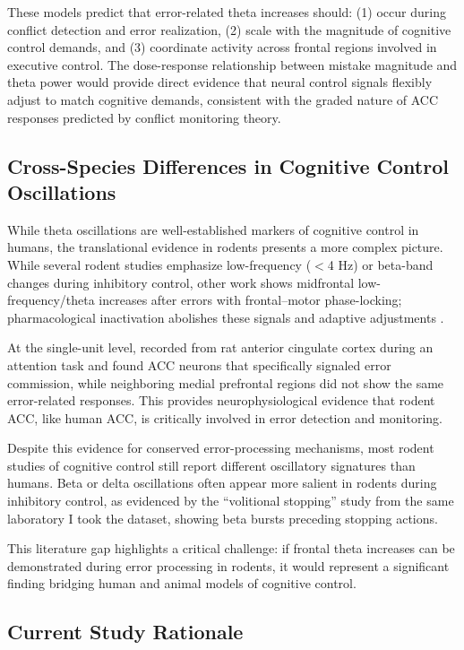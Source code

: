 \documentclass[11pt]{article}
\begin{document}
These models predict that error-related theta increases should: (1) occur during conflict detection and error realization, (2) scale with the magnitude of cognitive control demands, and (3) coordinate activity across frontal regions involved in executive control. The dose-response relationship between mistake magnitude and theta power would provide direct evidence that neural control signals flexibly adjust to match cognitive demands, consistent with the graded nature of ACC responses predicted by conflict monitoring theory.

\subsection{Cross-Species Differences in Cognitive Control Oscillations}

While theta oscillations are well-established markers of cognitive control in humans, the translational evidence in rodents presents a more complex picture. While several rodent studies emphasize low-frequency ($<$4 Hz) or beta-band changes during inhibitory control, other work shows midfrontal low-frequency/theta increases after errors with frontal–motor phase-locking; pharmacological inactivation abolishes these signals and adaptive adjustments \citep{narayanan2013common}.

At the single-unit level, \citet{totah2009anterior} recorded from rat anterior cingulate cortex during an attention task and found ACC neurons that specifically signaled error commission, while neighboring medial prefrontal regions did not show the same error-related responses. This provides neurophysiological evidence that rodent ACC, like human ACC, is critically involved in error detection and monitoring.

Despite this evidence for conserved error-processing mechanisms, most rodent studies of cognitive control still report different oscillatory signatures than humans. Beta or delta oscillations often appear more salient in rodents during inhibitory control, as evidenced by the ``volitional stopping'' study from the same laboratory I took the dataset, showing beta bursts preceding stopping actions.

This literature gap highlights a critical challenge: if frontal theta increases can be demonstrated during error processing in rodents, it would represent a significant finding bridging human and animal models of cognitive control.

\subsection{Current Study Rationale}
\end{document}
